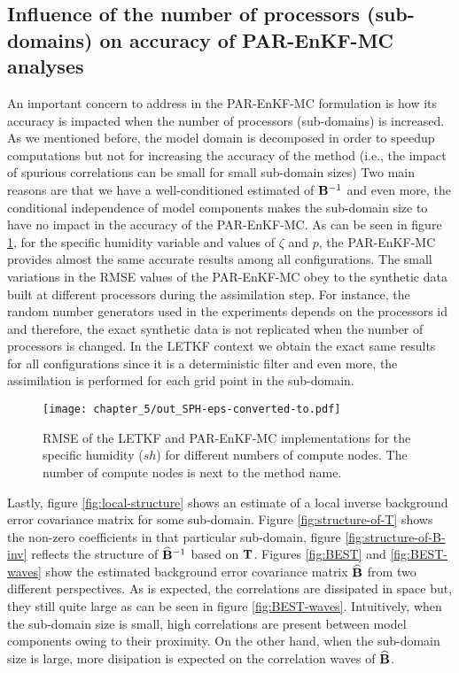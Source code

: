 \documentclass[12pt]{article}
\newcommand{\T}{{\bf T}}
\newcommand{\ra}{\zeta}
\newcommand{\B}{{\bf B}} \newcommand{\R}{{\bf R}} \newcommand{\N}{M} \newcommand{\y}{{\bf y}} \renewcommand{\H}{{\bf H}} \newcommand{\xm}{{\overline{\bf x}}} \newcommand{\xb}{{\bf x}^{\rm b}} \newcommand{\BAS}{{{\boldsymbol \Phi} }} \newcommand{\bas}{{{ \boldsymbol \phi} }} \newcommand{\w}{{\bf r}} \newcommand{\W}{{\boldsymbol \alpha}} \newcommand{\I}{{\bf I}} \newcommand{\M}{\mathcal{M}} \newcommand{\Nor}{\mathcal{N}} \newcommand{\Y}{{\bf Y}} \newcommand{\xt}{{\bf x}^{\rm true}} \newcommand{\Ho}{{\mathcal{H}}} \newcommand{\lle}{\left \{ } \newcommand{\rle}{\right \}} \newcommand{\dx}{{{\boldsymbol \delta} {\bf x}}}
\newcommand{\BEST}{\widehat{\bf B}}
\begin{document}
\subsection{Influence of the number of processors (sub-domains) on accuracy of PAR-EnKF-MC analyses}
\label{subsec:accuracy-PAR-EnKF-MC}
An important concern to address in the PAR-EnKF-MC formulation is how its accuracy is impacted when the number of processors (sub-domains) is increased. As we mentioned before, the model domain is decomposed in order to speedup computations but not for increasing the accuracy of the method (i.e., the impact of spurious correlations can be small for small sub-domain sizes) Two main reasons are that we have a well-conditioned estimated of $\B^{-1}$ and even more, the conditional independence of model components makes the sub-domain size to have no impact in the accuracy of the PAR-EnKF-MC. As can be seen in figure \ref{fig:different-variables-processors}, for the specific humidity variable and values of $\ra$ and $p$, the PAR-EnKF-MC provides almost the same accurate results among all configurations. The small variations in the RMSE values of the PAR-EnKF-MC obey to the synthetic data built at different processors during the assimilation step. For instance, the random number generators used in the experiments depends on the processors id and therefore, the exact synthetic data is not replicated when the number of processors is changed. In the LETKF context we obtain the exact same results for all configurations since it is a deterministic filter and even more, the assimilation is performed for each grid point in the sub-domain.
\begin{figure}[htp]
\centering


\texttt{[image: chapter\_5/out\_SPH-eps-converted-to.pdf]}
\caption{RMSE of the LETKF and PAR-EnKF-MC implementations for the specific humidity ($sh$) for different numbers of compute nodes. The number of compute nodes is next to the method name.}
\label{fig:different-variables-processors}
\end{figure}
Lastly, figure \ref{fig:local-structure} shows an estimate of a local inverse background error covariance matrix for some sub-domain. Figure \ref{fig:structure-of-T} shows the non-zero coefficients in that particular sub-domain, figure \ref{fig:structure-of-B-inv} reflects the structure of $\BEST^{-1}$ based on $\T$. Figures \ref{fig:BEST} and \ref{fig:BEST-waves} show the estimated background error covariance matrix $\BEST$ from two different perspectives. As is expected, the correlations are dissipated in space but, they still quite large as can be seen in figure \ref{fig:BEST-waves}. Intuitively, when the sub-domain size is small, high correlations are present between model components owing to their proximity. On the other hand, when the sub-domain size is large, more disipation is expected on the correlation waves of $\BEST$.
\end{document}
